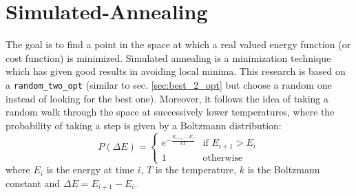 \section{Simulated-Annealing}
The goal is to find a point in the space at which a real valued energy function (or cost function) is minimized. Simulated annealing is a minimization technique which has given good results in avoiding local minima. This research is based on a \texttt{random\_two\_opt} (similar to sec. \ref{sec:best_2_opt} but choose a random one instead of looking for the best one). Moreover, it follows the idea of taking a random walk through the space at successively lower temperatures, where the probability of taking a step is given by a Boltzmann distribution:
\begin{equation}
	P(\Delta E)= \begin{cases} 
	e^{-\frac{ E_{i+1} - E_{i}}{kT}} & \text{if } E_{i+1} > E_{i} \\
	1 & \text{otherwise}
	\end{cases}
\end{equation}
where $ E_{i} $ is the energy at time $ i $, $ T $ is the temperature, $k$ is the Boltzmann constant and $\Delta E =  E_{i+1} - E_{i}$. \\

